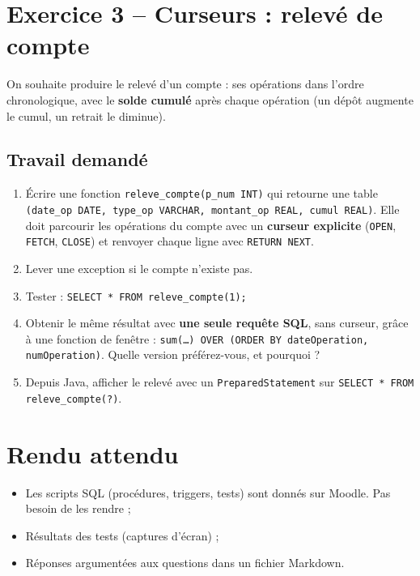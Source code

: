 \documentclass[11pt]{article}
\begin{document}
\section*{Exercice 3 -- Curseurs : relevé de compte}

On souhaite produire le relevé d'un compte : ses opérations dans l'ordre chronologique, avec le
\textbf{solde cumulé} après chaque opération (un dépôt augmente le cumul, un retrait le diminue).

\subsection*{Travail demandé}
\begin{enumerate}[label=\alph*)]
    \item Écrire une fonction \texttt{releve\_compte(p\_num INT)} qui retourne une table
    \texttt{(date\_op DATE, type\_op VARCHAR, montant\_op REAL, cumul REAL)}. Elle doit parcourir les
    opérations du compte avec un \textbf{curseur explicite} (\texttt{OPEN}, \texttt{FETCH}, \texttt{CLOSE})
    et renvoyer chaque ligne avec \texttt{RETURN NEXT}.
    \item Lever une exception si le compte n'existe pas.
    \item Tester : \texttt{SELECT * FROM releve\_compte(1);}
    \item Obtenir le même résultat avec \textbf{une seule requête SQL}, sans curseur, grâce à une fonction de fenêtre :
    \texttt{sum(\ldots) OVER (ORDER BY dateOperation, numOperation)}. Quelle version préférez-vous, et pourquoi ?
    \item Depuis Java, afficher le relevé avec un \texttt{PreparedStatement} sur
    \texttt{SELECT * FROM releve\_compte(?)}.
\end{enumerate}

\bigskip

\section*{Rendu attendu}

\begin{itemize}
    \item Les scripts SQL (procédures, triggers, tests) sont donnés sur Moodle. Pas besoin de les rendre ;
    \item Résultats des tests (captures d'écran) ;
    \item Réponses argumentées aux questions dans un fichier Markdown.
\end{itemize}
\end{document}
